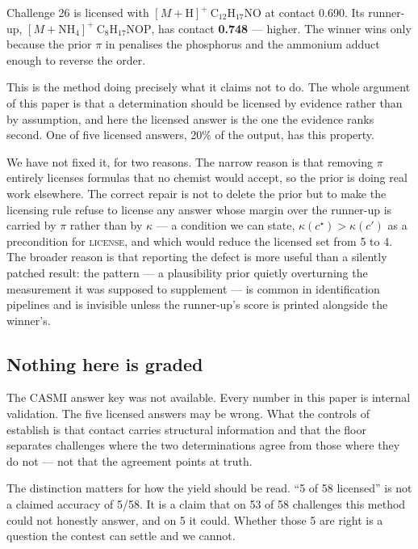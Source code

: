 \documentclass[11pt,twocolumn,a4paper]{article}
\theoremstyle{definition}
\theoremstyle{remark}
\newcommand{\con}{\kappa}
\newcommand{\licenseword}{\textsc{license}}
\begin{document}
Challenge 26 is licensed with $[M+\mathrm{H}]^+\ \mathrm{C_{12}H_{17}NO}$ at
contact 0.690. Its runner-up, $[M+\mathrm{NH_4}]^+\ \mathrm{C_8H_{17}NOP}$, has
contact \textbf{0.748} --- higher. The winner wins only because the prior $\pi$ in
 penalises the phosphorus and the ammonium adduct enough to
reverse the order.

This is the method doing precisely what it claims not to do. The whole argument of
this paper is that a determination should be licensed by evidence rather than by
assumption, and here the licensed answer is the one the evidence ranks second.
One of five licensed answers, 20\% of the output, has this property.

We have not fixed it, for two reasons. The narrow reason is that removing $\pi$
entirely licenses formulas that no chemist would accept, so the prior is doing
real work elsewhere. The correct repair is not to delete the prior but to make the
licensing rule refuse to license any answer whose margin over the runner-up is
carried by $\pi$ rather than by $\con$ --- a condition we can state,
$\con(c^\star) > \con(c')$ as a precondition for \licenseword, and which would
reduce the licensed set from 5 to 4. The broader reason is that reporting the
defect is more useful than a silently patched result: the pattern --- a
plausibility prior quietly overturning the measurement it was supposed to
supplement --- is common in identification pipelines and is invisible unless the
runner-up's score is printed alongside the winner's.

\subsection{Nothing here is graded}
\label{sec:defect-key}

The CASMI answer key was not available. Every number in this paper is internal
validation. The five licensed answers may be wrong. What the controls of
 establish is that contact carries structural information
and that the floor separates challenges where the two determinations agree from
those where they do not --- not that the agreement points at truth.

The distinction matters for how the yield should be read. ``5 of 58 licensed''
is not a claimed accuracy of 5/58. It is a claim that on 53 of 58 challenges this
method could not honestly answer, and on 5 it could. Whether those 5 are right is
a question the contest can settle and we cannot.
\end{document}
